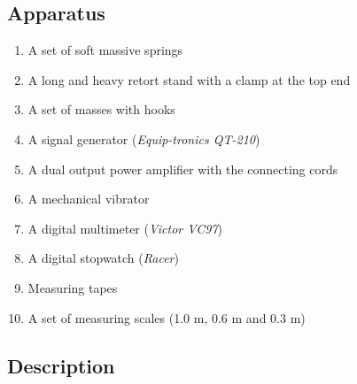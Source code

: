 \subsection*{Apparatus}

\begin{enumerate}[label=\arabic*)]
\itemsep0em
\item A set of soft massive springs
\item A long and heavy retort stand with a clamp at the top end 
\item A set of masses with hooks
\item A signal generator (\textit{Equip-tronics QT-210})
\item A dual output power amplifier with the connecting cords
\item A mechanical vibrator
\item A digital multimeter (\textit{Victor VC97})
\item A digital stopwatch (\textit{Racer})
\item Measuring tapes
\item A set of measuring scales (1.0 m, 0.6 m and 0.3 m)
\end{enumerate}

\subsection*{Description}

